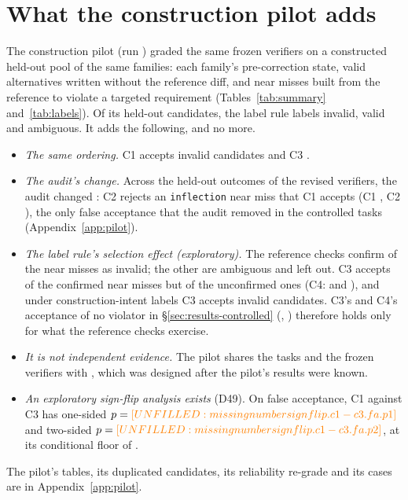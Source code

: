 \section{What the construction pilot adds}
\label{sec:pilot}
The construction pilot (run \texttt{\PILOTRUN}) graded the same frozen verifiers on a constructed held-out pool of the same  families: each family's pre-correction state, valid alternatives written without the reference diff, and near misses built from the reference to violate a targeted requirement (Tables~\ref{tab:summary} and~\ref{tab:labels}). Of its  held-out candidates, the label rule labels  invalid,  valid and  ambiguous. It adds the following, and no more.
\begin{itemize}
\item \emph{The same ordering.} C1 accepts  invalid candidates and C3 .
\item \emph{The audit's  change.} Across the held-out outcomes of the revised verifiers, the audit changed : C2 rejects an \texttt{inflection} near miss that C1 accepts (C1 , C2 ), the only false acceptance that the audit removed in the controlled tasks (Appendix~\ref{app:pilot}).
\item \emph{The label rule's selection effect (exploratory).} The reference checks confirm  of the  near misses as invalid; the other  are ambiguous and left out. C3 accepts  of the confirmed near misses but  of the unconfirmed ones (C4:  and ), and under construction-intent labels C3 accepts  invalid candidates. C3's and C4's acceptance of no violator in \S\ref{sec:results-controlled} (, ) therefore holds only for what the reference checks exercise.
\item \emph{It is not independent evidence.} The pilot shares the tasks and the frozen verifiers with \texttt{\FRESHRUN}, which was designed after the pilot's results were known.
\item \emph{An exploratory sign-flip analysis exists} (D49). On false acceptance, C1 against C3 has one-sided $p=\plv{signflip.c1-c3.fa.p1}$ and two-sided $p=\plv{signflip.c1-c3.fa.p2}$, at its conditional floor of .
\end{itemize}
The pilot's tables, its duplicated candidates, its reliability re-grade and its cases are in Appendix~\ref{app:pilot}.
